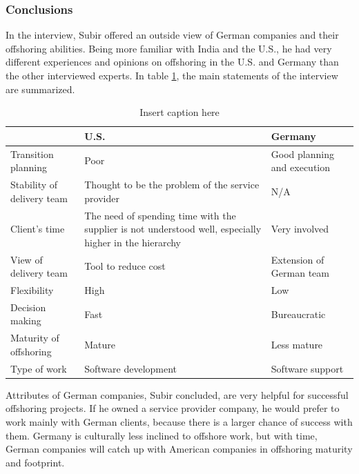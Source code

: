 \subsubsection{Conclusions}
In the interview, Subir offered an outside view of German companies and their offshoring abilities. Being more familiar with India and the U.S., he had very different experiences and opinions on offshoring in the U.S. and Germany than the other interviewed experts. In table \ref{tab:SubirComparison}, the main statements of the interview are summarized.
\vspace{3mm}
\begin{table}[htb]
	\centering
	\begin{tabular}{l|p{5.1cm}|p{5.1cm}}
		& \textbf{U.S.} & \textbf{Germany}\\\hline
		\rule{0pt}{3ex}Transition planning&Poor& Good planning and execution\\ \hline
		\rule{0pt}{3ex}Stability of delivery team&Thought to be the problem of the service provider & N/A \\ \hline
		\rule{0pt}{3ex}Client's time &The need of spending time with the supplier is not understood well, especially higher in the hierarchy & Very involved \\ \hline
		\rule{0pt}{3ex}View of delivery team& Tool to reduce cost&Extension of German team \\ \hline
		\rule{0pt}{3ex}Flexibility&High &Low \\ \hline
		\rule{0pt}{3ex}Decision making &Fast &Bureaucratic \\ \hline
		\rule{0pt}{3ex}Maturity of offshoring &Mature & Less mature \\ \hline
		\rule{0pt}{3ex}Type of work & Software development & Software support\\ \hline
	\end{tabular}
	\vspace{3mm}
	\caption{Insert caption here}%
	\label{tab:SubirComparison}
\end{table}

Attributes of German companies, Subir concluded, are very helpful for successful offshoring projects. If he owned a service provider company, he would prefer to work mainly with German clients, because there is a larger chance of success with them. Germany is culturally less inclined to offshore work, but with time, German companies will catch up with American companies in offshoring maturity and footprint.

